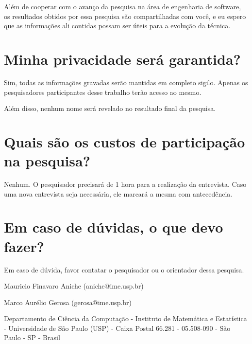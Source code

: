 Além de cooperar com o avanço da pesquisa na área de engenharia de software, os
resultados obtidos por essa pesquisa são compartilhadas com você, e eu espero
que as informações ali contidas possam ser úteis para a evolução da técnica.

\section{Minha privacidade será garantida?}

Sim, todas as informações gravadas serão mantidas em completo sigilo. Apenas os
pesquisadores participantes desse trabalho terão acesso ao mesmo.

Além disso, nenhum nome será revelado no resultado final da pesquisa.

\section{Quais são os custos de participação na pesquisa?}

Nenhum. O pesquisador precisará de 1 hora para a realização da entrevista. Caso
uma nova entrevista seja necessária, ele marcará a mesma com antecedência. 

\section{Em caso de dúvidas, o que devo fazer?}

Em caso de dúvida, favor contatar o pesquisador ou o orientador dessa pesquisa.

Mauricio Finavaro Aniche (aniche@ime.usp.br)

Marco Aurélio Gerosa (gerosa@ime.usp.br) 

Departamento de Ciência da Computação - Instituto de Matemática e Estatística - 
Universidade de São Paulo (USP) - Caixa Postal 66.281 - 05.508-090 - São Paulo -
SP  - Brasil

